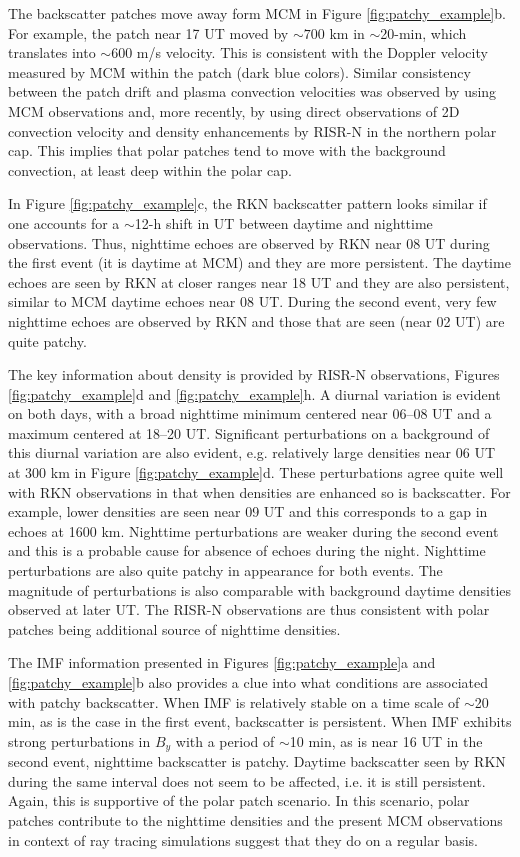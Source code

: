 The backscatter patches move away form MCM in Figure \ref{fig:patchy_example}b.  For example, the patch near 17 UT moved by \(\sim700\) km in \(\sim\)20-min, which translates into \(\sim600\) m/s velocity.  This is consistent with the Doppler velocity measured by MCM within the patch (dark blue colors).  Similar consistency between the patch drift and plasma convection velocities was observed by \citet{Bristow2011} using MCM observations and, more recently, by \citet{Makarevich2015b} using direct observations of 2D convection velocity and density enhancements by RISR-N in the northern polar cap.  This implies that polar patches tend to move with the background convection, at least deep within the polar cap.

In Figure \ref{fig:patchy_example}c, the RKN backscatter pattern looks similar if one accounts for a \(\sim\)12-h  shift in UT between daytime and nighttime observations. Thus, nighttime echoes are observed by RKN near 08 UT during the first event (it is daytime at MCM) and they are more persistent. The daytime echoes are seen by RKN at closer ranges near 18 UT and they are also persistent, similar to MCM daytime echoes near 08 UT. During the second event, very few nighttime echoes are observed by RKN and those that are seen (near 02 UT) are quite patchy.

The key information about density is provided by RISR-N observations, Figures \ref{fig:patchy_example}d and \ref{fig:patchy_example}h. A diurnal variation is evident on both days, with a broad nighttime minimum centered near 06--08 UT and a maximum centered at 18--20 UT. Significant perturbations on a background of this diurnal variation are also evident, e.g. relatively large densities near 06 UT at 300 km in Figure \ref{fig:patchy_example}d. These perturbations agree quite well with RKN observations in that when densities are enhanced so is backscatter. For example, lower densities are seen near 09 UT and this corresponds to a gap in echoes at 1600 km. Nighttime perturbations are weaker during the second event and this is a probable cause for absence of echoes during the night. Nighttime perturbations are also quite patchy in appearance for both events. The magnitude of perturbations is also comparable with background daytime densities observed at later UT. The RISR-N observations are thus consistent with polar patches being additional source of nighttime densities.

The IMF information presented in Figures \ref{fig:patchy_example}a and \ref{fig:patchy_example}b also provides a clue into what conditions are associated with patchy backscatter. When IMF is relatively stable on a time scale of \(\sim\)20 min, as is the case in the first event, backscatter is persistent. When IMF exhibits strong perturbations in \(B_y\) with a period of \(\sim\)10 min, as is near 16 UT in the second event, nighttime backscatter is patchy. Daytime backscatter seen by RKN during the same interval does not seem to be affected, i.e. it is still persistent. Again, this is supportive of the polar patch scenario.  In this scenario, polar patches contribute to the nighttime densities and the present MCM observations in context of ray tracing simulations suggest that they do on a regular basis.



